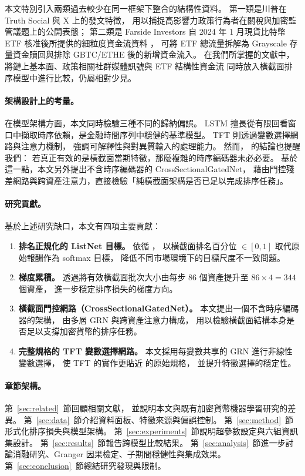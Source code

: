 本文特別引入兩類過去較少在同一框架下整合的結構性資料。
第一類是川普在 Truth Social 與 X 上的發文特徵，
用以捕捉高影響力政策行為者在關稅與加密監管議題上的公開表態；
第二類是 Farside Investors 自 2024 年 1 月現貨比特幣 ETF 核准後所提供的細粒度資金流資料
\citep{bitcoin_etf_farside}，
可將 ETF 總流量拆解為 Grayscale 存量資金贖回與排除 GBTC/ETHE 後的新增資金流入。
在我們所掌握的文獻中，
將鏈上基本面、政策相關社群媒體訊號與 ETF 結構性資金流
同時放入橫截面排序模型中進行比較，仍屬相對少見。

\paragraph{架構設計上的考量。}
在模型架構方面，本文同時檢驗三種不同的歸納偏誤。
LSTM \citep{hochreiter1997long,fischer2018lstm_finance}
擅長從有限回看窗口中擷取時序依賴，是金融時間序列中穩健的基準模型。
TFT \citep{lim2021temporal} 則透過變數選擇網路與注意力機制，
強調可解釋性與對異質輸入的處理能力。
然而，\citet{gu2020empirical} 的結論也提醒我們：
若真正有效的是橫截面當期特徵，那麼複雜的時序編碼器未必必要。
基於這一點，本文另外提出不含時序編碼器的 CrossSectionalGatedNet，
藉由門控殘差網路與跨資產注意力，直接檢驗「純橫截面架構是否已足以完成排序任務」。

\paragraph{研究貢獻。}
基於上述研究缺口，本文有四項主要貢獻：
\begin{enumerate}
  \item \textbf{排名正規化的 ListNet 目標。}
        依循 \citet{poh2021building}，
        以橫截面排名百分位 $\in [0, 1]$ 取代原始報酬作為 softmax 目標，
        降低不同市場環境下的目標尺度不一致問題。
  \item \textbf{梯度累積。}
        透過將有效橫截面批次大小由每步 86 個資產提升至
        $86 \times 4 = 344$ 個資產，
        進一步穩定排序損失的梯度方向。
  \item \textbf{橫截面門控網路（CrossSectionalGatedNet）。}
        本文提出一個不含時序編碼器的架構，
        由多層 GRN 與跨資產注意力構成，
        用以檢驗橫截面結構本身是否足以支撐加密貨幣的排序任務。
  \item \textbf{完整規格的 TFT 變數選擇網路。}
        本文採用每變數共享的 GRN 進行非線性變數選擇，
        使 TFT 的實作更貼近 \citet{lim2021temporal} 的原始規格，
        並提升特徵選擇的穩定性。
\end{enumerate}

\paragraph{章節架構。}
第~\ref{sec:related}~節回顧相關文獻，
並說明本文與既有加密貨幣機器學習研究的差異。
第~\ref{sec:data}~節介紹資料面板、特徵來源與偏誤控制。
第~\ref{sec:method}~節形式化排序損失與模型架構。
第~\ref{sec:experiments}~節說明超參數設定與六組資訊集設計。
第~\ref{sec:results}~節報告跨模型比較結果。
第~\ref{sec:analysis}~節進一步討論消融研究、Granger 因果檢定、子期間穩健性與集成效果。
第~\ref{sec:conclusion}~節總結研究發現與限制。
